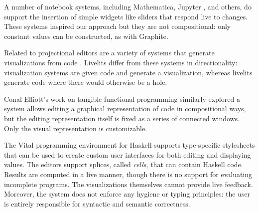 A number of notebook systems, including Mathematica, Jupyter \cite{Guo13}, and others, do 
support the insertion of simple widgets like sliders that respond live to changes.
These systems inspired our approach but they are not compositional: only constant values can be constructed, as with Graphite.

Related to projectional editors are 
a variety of systems that generate visualizations from code \cite{DBLP:conf/chi/Lerner20,koschke2003software,urquiza2004survey}. Livelits differ 
from these systems in directionality: visualization systems are given code and generate
a visualization, whereas livelits generate code where there would otherwise
be a hole.

Conal Elliott's work on tangible functional programming \cite{DBLP:conf/icfp/Elliott07} similarly explored a
system allows editing a graphical representation of code in compositional ways, 
but the editing representation itself is fixed as a series of connected windows.
Only the visual representation is customizable.

The Vital programming environment for Haskell \cite{hanna2002interactive} 
supports type-specific stylesheets
that can be used to create custom user interfaces for both editing and displaying
values. The editors support splices, called \emph{cells}, that can contain 
Haskell code. Results are computed in a live manner, though there is no support
for evaluating incomplete programs. The visualizations themselves cannot provide
live feedback. Moreover, the system does not enforce any hygiene or typing principles:
the user is entirely responsible for syntactic and semantic correctness.


